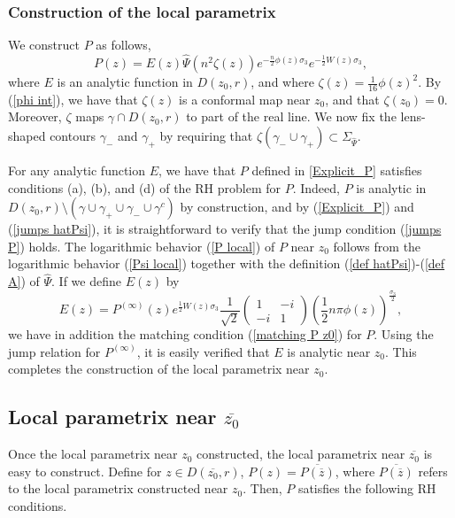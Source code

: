 \documentclass[11pt,fleqn]{article}
\numberwithin{equation}{section}
\begin{document}
\subsubsection{Construction of the local parametrix}

We construct $P$ as follows,
\begin{equation}\label{Explicit_P}
P(z)=E(z)\widehat\Psi(n^2\zeta(z))e^{-\frac{n}{2}\phi(z)\sigma_3}e^{-\frac{1}{2}W(z)\sigma_{3}},
\end{equation}
where $E$ is an analytic function in $D(z_0,r)$, and where
$\zeta(z) = \frac{1}{16} \phi(z)^{2}$. By (\ref{phi int}), we have that $\zeta(z)$ is a conformal map near $z_0$, and that $\zeta(z_0)=0$. Moreover, $\zeta$ maps $\gamma\cap D(z_0,r)$ to part of the real line. We now fix the lens-shaped contours $\gamma_-$ and $\gamma_+$ by requiring that $\zeta(\gamma_-\cup\gamma_+)\subset \Sigma_{\widehat\Psi}$.

For any analytic function $E$, we have that $P$ defined in \eqref{Explicit_P} satisfies conditions (a), (b), and (d) of the RH problem for $P$. Indeed, $P$ is analytic in $D(z_0,r)\setminus(\gamma\cup\gamma_+\cup\gamma_-\cup\gamma^c)$ by construction, and 
by (\ref{Explicit_P}) and (\ref{jumps hatPsi}), it is straightforward to verify that the jump condition
(\ref{jumps P}) holds. The logarithmic behavior (\ref{P local}) of $P$ near $z_0$ follows from the logarithmic behavior (\ref{Psi local}) together with the definition (\ref{def hatPsi})-(\ref{def A}) of $\widehat\Psi$.
If we define $E(z)$ by 
\begin{equation*}
E(z) = P^{(\infty)}(z)e^{\frac{1}{2}W(z)\sigma_{3}}  \frac{1}{\sqrt{2}} \begin{pmatrix}
1 & -i \\ -i & 1
\end{pmatrix} \left( \frac{1}{2} n\pi \phi(z) \right)^{\frac{\sigma_{3}}{2}},
\end{equation*}
we have in addition the matching condition (\ref{matching P z0}) for $P$.  Using the jump relation for $P^{(\infty)}$, it is easily verified that $E$ is analytic near $z_0$.
This completes the construction of the local parametrix near $z_0$.

\subsection{Local parametrix near $\overline{z_0}$}

Once the local parametrix near $z_0$ constructed, the local parametrix near $\overline{z_0}$ is easy to construct. Define for $z \in D(\overline{z_{0}},r)$,  $P(z)=\overline{P(\overline{z})}$, where $\overline{P(\overline{z})}$ refers to the local parametrix constructed near $z_{0}$. Then, $P$ satisfies the following RH conditions.
\end{document}
